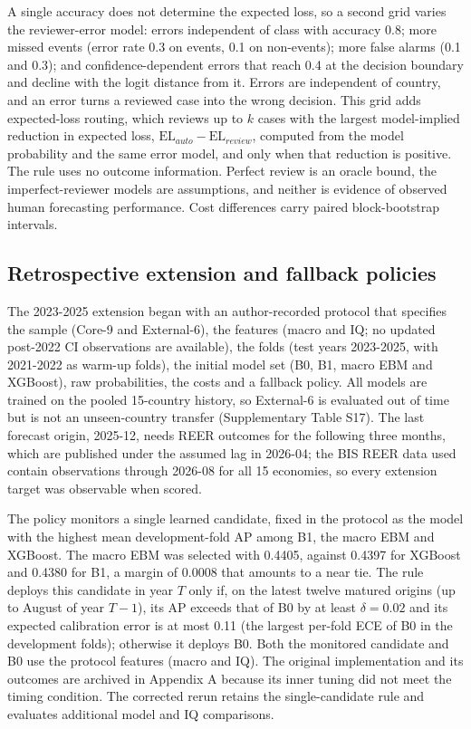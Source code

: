 \documentclass[preprint,12pt,authoryear]{elsarticle}
\begin{document}
A single accuracy does not determine the expected loss, so a second grid varies the reviewer-error model: errors independent of class with accuracy 0.8; more missed events (error rate 0.3 on events, 0.1 on non-events); more false alarms (0.1 and 0.3); and confidence-dependent errors that reach 0.4 at the decision boundary and decline with the logit distance from it. Errors are independent of country, and an error turns a reviewed case into the wrong decision. This grid adds expected-loss routing, which reviews up to $k$ cases with the largest model-implied reduction in expected loss, $\mathrm{EL}_{auto} - \mathrm{EL}_{review}$, computed from the model probability and the same error model, and only when that reduction is positive. The rule uses no outcome information. Perfect review is an oracle bound, the imperfect-reviewer models are assumptions, and neither is evidence of observed human forecasting performance. Cost differences carry paired block-bootstrap intervals.

\subsection{Retrospective extension and fallback policies}
The 2023-2025 extension began with an author-recorded protocol that specifies the sample (Core-9 and External-6), the features (macro and IQ; no updated post-2022 CI observations are available), the folds (test years 2023-2025, with 2021-2022 as warm-up folds), the initial model set (B0, B1, macro EBM and XGBoost), raw probabilities, the costs and a fallback policy. All models are trained on the pooled 15-country history, so External-6 is evaluated out of time but is not an unseen-country transfer (Supplementary Table S17). The last forecast origin, 2025-12, needs REER outcomes for the following three months, which are published under the assumed lag in 2026-04; the BIS REER data used contain observations through 2026-08 for all 15 economies, so every extension target was observable when scored.

The policy monitors a single learned candidate, fixed in the protocol as the model with the highest mean development-fold AP among B1, the macro EBM and XGBoost. The macro EBM was selected with 0.4405, against 0.4397 for XGBoost and 0.4380 for B1, a margin of 0.0008 that amounts to a near tie. The rule deploys this candidate in year $T$ only if, on the latest twelve matured origins (up to August of year $T-1$), its AP exceeds that of B0 by at least $\delta = 0.02$ and its expected calibration error is at most 0.11 (the largest per-fold ECE of B0 in the development folds); otherwise it deploys B0. Both the monitored candidate and B0 use the protocol features (macro and IQ). The original implementation and its outcomes are archived in Appendix A because its inner tuning did not meet the timing condition. The corrected rerun retains the single-candidate rule and evaluates additional model and IQ comparisons.
\end{document}
